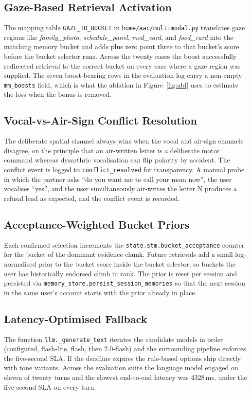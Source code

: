 \documentclass[10pt,letterpaper]{article}
\begin{document}
\subsection{Gaze-Based Retrieval Activation}
The mapping table \texttt{GAZE\_TO\_BUCKET} in
\texttt{home/aac/multimodal.py} translates gaze regions like
\textit{family\_photo}, \textit{schedule\_panel},
\textit{med\_card}, and \textit{food\_card} into the matching memory
bucket and adds plus zero point three to that bucket's score before
the bucket selector runs. Across the twenty cases the boost
successfully redirected retrieval to the correct bucket on every
case where a gaze region was supplied. The seven boost-bearing rows
in the evaluation log carry a non-empty \texttt{mm\_boosts} field,
which is what the ablation in Figure~\ref{fig:abl} uses to estimate
the loss when the bonus is removed.

\subsection{Vocal-vs-Air-Sign Conflict Resolution}
The deliberate spatial channel always wins when the vocal and
air-sign channels disagree, on the principle that an air-written
letter is a deliberate motor command whereas dysarthric vocalisation
can flip polarity by accident. The conflict event is logged to
\texttt{conflict\_resolved} for transparency. A manual probe in
which the partner asks ``do you want me to call your mom now'',
the user vocalises ``yes'', and the user simultaneously air-writes
the letter N produces a refusal lead as expected, and the conflict
event is recorded.

\subsection{Acceptance-Weighted Bucket Priors}
Each confirmed selection increments the
\texttt{state.stm.bucket\_acceptance} counter for the bucket of the
dominant evidence chunk. Future retrievals add a small log-normalised
prior to the bucket score inside the bucket selector, so buckets the
user has historically endorsed climb in rank. The prior is reset per
session and persisted via \texttt{memory\_store.persist\_session\_memories}
so that the next session in the same user's account starts with the
prior already in place.

\subsection{Latency-Optimised Fallback}
The function \texttt{llm.\_generate\_text} iterates the candidate
models in order (configured, flash-lite, flash, then 2.0-flash) and
the surrounding pipeline enforces the five-second SLA. If the
deadline expires the rule-based options ship directly with tone
variants. Across the evaluation suite the language model engaged on
eleven of twenty turns and the slowest end-to-end latency was 4328\,ms,
under the five-second SLA on every turn.
\end{document}
